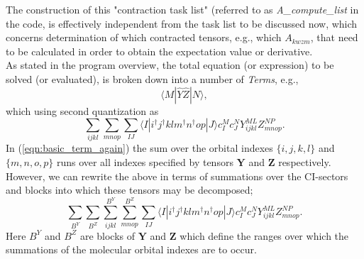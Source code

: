 \noindent  The construction of this "contraction task list" (referred to as \emph{A\_compute\_list} in the code, 
is effectively independent from the task list to be discussed now, which concerns determination of which
contracted tensors, e.g., which $A_{kwzm}$, that need to be calculated in order to obtain the expectation value
or derivative.\\

\noindent As stated in the program overview, the total equation (or expression) to be solved (or evaluated), is 
broken down into a number of \emph{Terms}, e.g., 
\begin{equation*}
\langle M | \hat{Y}\hat{Z} | N \rangle ,
\end{equation*}
which using second quantization as
\begin{equation}
\sum_{ijkl}\sum_{mnop} \sum_{IJ} \langle I | i^{\dagger}j^{\dagger}klm^{\dagger}n^{\dagger}op | J \rangle c^{M}_{I} c_{J}^{N} Y^{ML}_{ijkl}Z^{NP}_{mnop}.
\label{eqn:basic_term_again}
\end{equation}
\noindent In (\ref{eqn:basic_term_again}) the sum over the orbital indexes
$\{i,j,k,l\}$ and  $\{m,n,o,p\}$ runs over all indexes specified by tensors
$\mathbf{Y}$ and $\mathbf{Z}$ respectively. However, we can rewrite the above
in terms of summations over the CI-sectors and blocks into which these tensors may be
decomposed;
\begin{equation}
\sum_{B^{Y}}\sum_{B^{Z}}
\sum^{B^{Y}}_{ijkl}\sum^{B^{Z}}_{mnop} \sum_{IJ} \langle I | i^{\dagger}j^{\dagger}klm^{\dagger}n^{\dagger}op | J \rangle c^{M}_{I} c_{J}^{N} Y^{ML}_{ijkl}Z^{NP}_{mnop}.
\label{eqn:basic_term_block_wise}
\end{equation}
\noindent Here $B^{Y}$ and $B^{Z}$ are blocks of $\mathbf{Y}$ and $\mathbf{Z}$
which define the ranges over which the summations of the molecular orbital
indexes are to occur.\\

